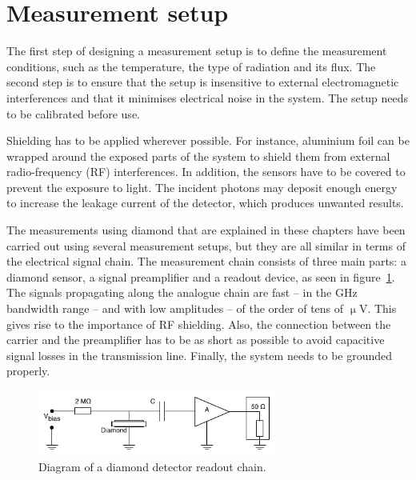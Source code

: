\section{Measurement setup}
\label{sec:meassetup}
The first step of designing a measurement setup is to define the measurement conditions, such as the temperature, the type of radiation and its flux. The second step is to ensure that the setup is insensitive to external electromagnetic interferences and that it minimises electrical noise in the system. The setup needs to be calibrated before use. 

Shielding has to be applied wherever possible. For instance, aluminium foil can be wrapped around the exposed parts of the system to shield them from external radio-frequency (RF) interferences. In addition, the sensors have to be covered to prevent the exposure to light. The incident photons may deposit enough energy to increase the leakage current of the detector, which produces unwanted results.

The measurements using diamond that are explained in these chapters have been carried out using several measurement setups, but they are all similar in terms of the electrical signal chain. The measurement chain consists of three main parts: a diamond sensor, a signal preamplifier and a readout device, as seen in figure~\ref{fig:ro-chain}. The signals propagating along the analogue chain are fast -- in the GHz bandwidth range --  and with low amplitudes -- of the order of tens of $\upmu$V. This gives rise to the importance of RF shielding. Also, the connection between the carrier and the preamplifier has to be as short as possible to avoid capacitive signal losses in the transmission line. Finally, the system needs to be grounded properly.

\begin{figure}
\centering
\includegraphics[width=0.7\textwidth]{03_measurement_results/plots/ro-chain}
\caption{Diagram of a diamond detector readout chain.}
\label{fig:ro-chain}
\end{figure}


